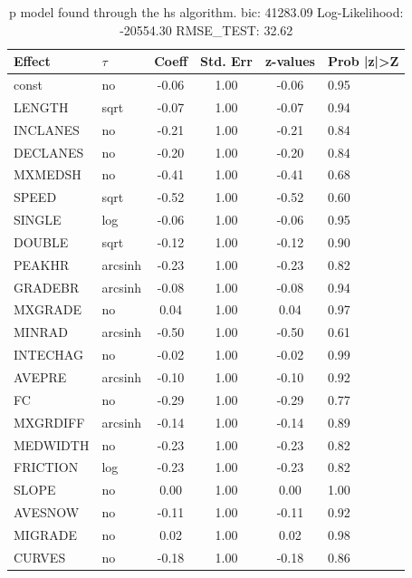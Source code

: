 \begin{table}
	\caption{p model found through the hs algorithm. bic: 41283.09 Log-Likelihood: -20554.30 RMSE_TEST: 32.62}
	\begin{center}
		\begin{tabular}{|l|l|c|c|c|l|}
			\hline
			Effect & $\tau$ & Coeff & Std. Err & z-values & Prob |z|>Z \\
			\hline
			const & no & -0.06 & 1.00 & -0.06 & 0.95 \\
			\hline
			LENGTH & sqrt & -0.07 & 1.00 & -0.07 & 0.94 \\
			\hline
			INCLANES & no & -0.21 & 1.00 & -0.21 & 0.84 \\
			\hline
			DECLANES & no & -0.20 & 1.00 & -0.20 & 0.84 \\
			\hline
			MXMEDSH & no & -0.41 & 1.00 & -0.41 & 0.68 \\
			\hline
			SPEED & sqrt & -0.52 & 1.00 & -0.52 & 0.60 \\
			\hline
			SINGLE & log & -0.06 & 1.00 & -0.06 & 0.95 \\
			\hline
			DOUBLE & sqrt & -0.12 & 1.00 & -0.12 & 0.90 \\
			\hline
			PEAKHR & arcsinh & -0.23 & 1.00 & -0.23 & 0.82 \\
			\hline
			GRADEBR & arcsinh & -0.08 & 1.00 & -0.08 & 0.94 \\
			\hline
			MXGRADE & no & 0.04 & 1.00 & 0.04 & 0.97 \\
			\hline
			MINRAD & arcsinh & -0.50 & 1.00 & -0.50 & 0.61 \\
			\hline
			INTECHAG & no & -0.02 & 1.00 & -0.02 & 0.99 \\
			\hline
			AVEPRE & arcsinh & -0.10 & 1.00 & -0.10 & 0.92 \\
			\hline
			FC & no & -0.29 & 1.00 & -0.29 & 0.77 \\
			\hline
			MXGRDIFF & arcsinh & -0.14 & 1.00 & -0.14 & 0.89 \\
			\hline
			MEDWIDTH & no & -0.23 & 1.00 & -0.23 & 0.82 \\
			\hline
			FRICTION & log & -0.23 & 1.00 & -0.23 & 0.82 \\
			\hline
			SLOPE & no & 0.00 & 1.00 & 0.00 & 1.00 \\
			\hline
			AVESNOW & no & -0.11 & 1.00 & -0.11 & 0.92 \\
			\hline
			MIGRADE & no & 0.02 & 1.00 & 0.02 & 0.98 \\
			\hline
			CURVES & no & -0.18 & 1.00 & -0.18 & 0.86 \\
			\hline

\end{tabular}
\end{center}
\end{table}
